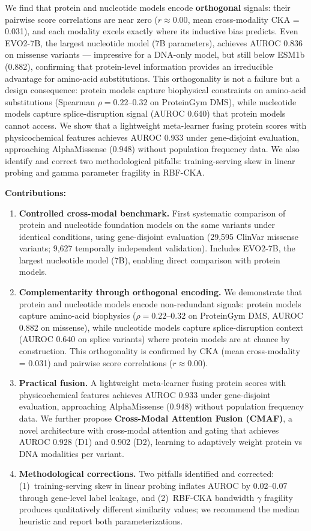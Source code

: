 \documentclass[9pt]{article}
\begin{document}
We find that protein and nucleotide models encode \textbf{orthogonal} signals: their pairwise score correlations are near zero ($r \approx 0.00$, mean cross-modality CKA = 0.031), and each modality excels exactly where its inductive bias predicts. Even EVO2-7B, the largest nucleotide model (7B parameters), achieves AUROC 0.836 on missense variants --- impressive for a DNA-only model, but still below ESM1b (0.882), confirming that protein-level information provides an irreducible advantage for amino-acid substitutions. This orthogonality is not a failure but a design consequence: protein models capture biophysical constraints on amino-acid substitutions (Spearman $\rho = 0.22$--$0.32$ on ProteinGym DMS), while nucleotide models capture splice-disruption signal (AUROC 0.640) that protein models cannot access. We show that a lightweight meta-learner fusing protein scores with physicochemical features achieves AUROC 0.933 under gene-disjoint evaluation, approaching AlphaMissense (0.948) without population frequency data. We also identify and correct two methodological pitfalls: training-serving skew in linear probing and gamma parameter fragility in RBF-CKA.

\textbf{Contributions:}
\begin{enumerate}
    \item \textbf{Controlled cross-modal benchmark.} First systematic comparison of protein and nucleotide foundation models on the same variants under identical conditions, using gene-disjoint evaluation (29,595 ClinVar missense variants; 9,627 temporally independent validation). Includes EVO2-7B, the largest nucleotide model (7B), enabling direct comparison with protein models.
    \item \textbf{Complementarity through orthogonal encoding.} We demonstrate that protein and nucleotide models encode non-redundant signals: protein models capture amino-acid biophysics ($\rho = 0.22$--$0.32$ on ProteinGym DMS, AUROC 0.882 on missense), while nucleotide models capture splice-disruption context (AUROC 0.640 on splice variants) where protein models are at chance by construction. This orthogonality is confirmed by CKA (mean cross-modality = 0.031) and pairwise score correlations ($r \approx 0.00$).
    \item \textbf{Practical fusion.} A lightweight meta-learner fusing protein scores with physicochemical features achieves AUROC 0.933 under gene-disjoint evaluation, approaching AlphaMissense (0.948) without population frequency data. We further propose \textbf{Cross-Modal Attention Fusion (CMAF)}, a novel architecture with cross-modal attention and gating that achieves AUROC 0.928 (D1) and 0.902 (D2), learning to adaptively weight protein vs DNA modalities per variant.
    \item \textbf{Methodological corrections.} Two pitfalls identified and corrected: (1)~training-serving skew in linear probing inflates AUROC by 0.02--0.07 through gene-level label leakage, and (2)~RBF-CKA bandwidth $\gamma$ fragility produces qualitatively different similarity values; we recommend the median heuristic and report both parameterizations.
\end{enumerate}
\end{document}
